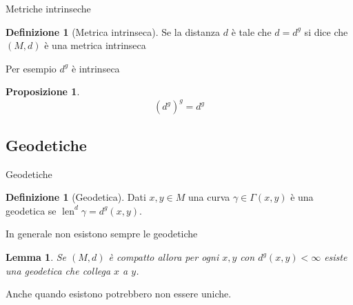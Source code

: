 \documentclass{beamer}
\newcounter{counter1}
\theoremstyle{plain}
\newtheorem{mylem}[counter1]{Lemma}
\newtheorem{mypro}[counter1]{Proposizione}
\theoremstyle{definition}
\newtheorem{mydef}[counter1]{Definizione}
\theoremstyle{remark}
\newcommand{\pa}[1]{\left(#1\right)}
\newcommand{\bra}[1]{\left[#1\right]}
\DeclareMathOperator{\len}{len}
\begin{document}
\begin{frame}{Metriche intrinseche}
  \begin{mydef}[Metrica intrinseca]
    Se la distanza $d$ è tale che $d = d^g$ si dice che $(M,d)$ è una
    metrica intrinseca
  \end{mydef}

  Per esempio $d^g$ è intrinseca
  \begin{mypro}
    \[\pa{d^g}^g = d^g\]
  \end{mypro}
\end{frame}

\subsection{Geodetiche}


\begin{frame}{Geodetiche}
  \begin{mydef}[Geodetica]
    Dati $x,y \in M$ una curva $\gamma \in \Gamma\pa{x,y}$ è una
    geodetica se $\len ^d \gamma = d^g(x,y)$.
  \end{mydef}

  In generale non esistono sempre le geodetiche
  \begin{mylem}
    Se $(M,d)$ è compatto allora per ogni $x,y$ con $d^g(x,y)<\infty$
    esiste una geodetica che collega $x$ a $y$.
  \end{mylem}

  Anche quando esistono potrebbero non essere uniche.
\end{frame}
\end{document}
